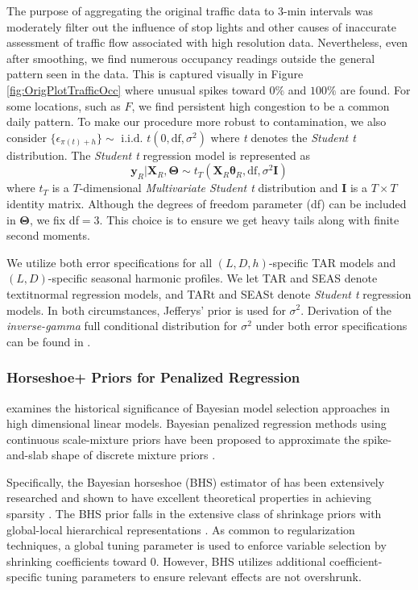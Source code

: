 The purpose of aggregating the original traffic data to 3-min intervals was moderately filter out the influence of stop lights and other causes of inaccurate assessment of traffic flow associated with high resolution data. Nevertheless, even after smoothing, we find numerous occupancy readings outside the general pattern seen in the data. This is captured visually in Figure \ref{fig:OrigPlotTrafficOcc} where unusual spikes toward $0\%$ and $100\%$ are found. For some locations, such as $F$, we find persistent high congestion to be a common daily pattern. To make our procedure more robust to contamination, we also consider  $\{\epsilon_{\pi(t)+h}\} \sim \textrm{ i.i.d. } t(0,\textrm{df},\sigma^2)$ where \textit{t} denotes the \textit{Student t} distribution. The \textit{Student t} regression model is represented as 
\begin{equation}
\label{eq:tmod}
\bm{y}_R|\bm{X}_R,\bm{\Theta}\sim t_T(\bm{X}_R\bm{\theta}_R,\textrm{df},\sigma^2\bm{I})
\end{equation}
where $t_T$ is a $T$-dimensional \textit{Multivariate Student t} distribution and $\bm{I}$ is a $T\times T$ identity matrix. Although the degrees of freedom parameter (df) can be included in $\bm{\Theta}$, we fix df$=3$. This choice is to ensure we get heavy tails along with finite second moments.

We utilize both error specifications for all $(L,D,h)$-specific TAR models and $(L,D)$-specific seasonal harmonic profiles. We let TAR and SEAS denote textit{normal} regression models, and TARt and SEASt denote \textit{Student t} regression models. In both circumstances, Jefferys' prior is used for $\sigma^2$. Derivation of the \textit{inverse-gamma} full conditional distribution for $\sigma^2$ under both error specifications can be found in \cite{bayesreg}.

\subsubsection{Horseshoe+ Priors for Penalized Regression}

\cite{Mallick2013} examines the historical significance of Bayesian model selection approaches in high dimensional linear models. Bayesian penalized regression methods using continuous scale-mixture priors \citep{OHara2009,Polson2010} have been proposed to approximate the spike-and-slab shape of discrete mixture priors \citep{Mitchell1988,George1993,Madigan1994,Carlin1995,Kuo1998,Ishwaran2005,Ishwaran2011}.

Specifically, the Bayesian horseshoe (BHS) estimator of \citep{Carvalho2009,Carvalho2010} has been extensively researched and shown to have excellent theoretical properties in achieving sparsity \citep{Polson2012,Datta2013,vanderPas2014}. The BHS prior falls in the extensive class of shrinkage priors with global-local hierarchical representations \citep{Polson2010}. As common to regularization techniques, a global tuning parameter is used to enforce variable selection by shrinking coefficients toward 0. However, BHS utilizes additional coefficient-specific tuning parameters to ensure relevant effects are not overshrunk. 

